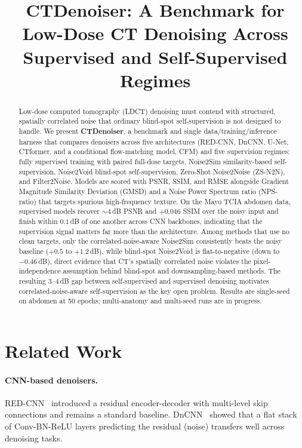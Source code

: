 \documentclass[10pt,twocolumn]{article}
\title{\textbf{CTDenoiser}: A Benchmark for Low-Dose CT Denoising
       Across Supervised and Self-Supervised Regimes}
\begin{document}
\maketitle

\begin{abstract}
Low-dose computed tomography (LDCT) denoising must contend with
structured, spatially correlated noise that ordinary blind-spot
self-supervision is not designed to handle.  We present \textbf{CTDenoiser},
a benchmark and single data/training/inference harness that compares
denoisers across five architectures (RED-CNN, DnCNN, U-Net, CTformer, and a
conditional flow-matching model, CFM) and five supervision regimes:
fully supervised training with paired full-dose targets, Noise2Sim
similarity-based self-supervision, Noise2Void blind-spot self-supervision,
Zero-Shot Noise2Noise (ZS-N2N), and Filter2Noise.  Models are scored with
PSNR, SSIM, and RMSE alongside Gradient Magnitude Similarity Deviation
(GMSD) and a Noise Power Spectrum ratio (NPS-ratio) that targets spurious
high-frequency texture.  On the Mayo TCIA abdomen data, supervised models
recover $\sim$4\,dB PSNR and $+0.046$ SSIM over the noisy input and finish
within $0.1$\,dB of one another across CNN backbones, indicating that the
supervision signal matters far more than the architecture.  Among methods
that use no clean targets, only the correlated-noise-aware Noise2Sim
consistently beats the noisy baseline ($+0.5$ to $+1.2$\,dB), while
blind-spot Noise2Void is flat-to-negative (down to $-0.46$\,dB), direct
evidence that CT's spatially correlated noise violates the
pixel-independence assumption behind blind-spot and downsampling-based
methods.  The resulting $3$--$4$\,dB gap between self-supervised and
supervised denoising motivates correlated-noise-aware self-supervision as
the key open problem.  Results are single-seed on abdomen at 50 epochs;
multi-anatomy and multi-seed runs are in progress.
\end{abstract}

\section{Related Work}

\paragraph{CNN-based denoisers.}
RED-CNN~\cite{chen2017lowdose} introduced a residual encoder-decoder with
multi-level skip connections and remains a standard baseline.
DnCNN~\cite{zhang2017beyond} showed that a flat stack of Conv-BN-ReLU
layers predicting the residual (noise) transfers well across denoising
tasks.
\end{document}
